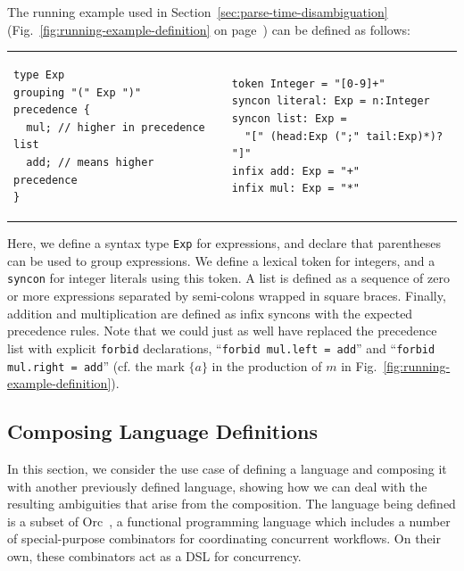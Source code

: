 \documentclass[acmsmall,review,anonymous]{acmart}\settopmatter{printfolios=true,printccs=false,printacmref=false}
\newcommand{\syncon}{\lstinline[language=syncon]}
\begin{document}
The running example used in
Section~\ref{sec:parse-time-disambiguation}
(Fig.~\ref{fig:running-example-definition} on
page~\pageref{fig:running-example-definition}) can be defined as
follows:

\begin{tabular}{ll}
\small
\begin{lstlisting}[language=syncon,boxpos=t]
type Exp
grouping "(" Exp ")"
precedence {
  mul; // higher in precedence list
  add; // means higher precedence
}
\end{lstlisting}
&
\small
\begin{lstlisting}[language=syncon,boxpos=t]
token Integer = "[0-9]+"
syncon literal: Exp = n:Integer
syncon list: Exp =
  "[" (head:Exp (";" tail:Exp)*)? "]"
infix add: Exp = "+"
infix mul: Exp = "*"
\end{lstlisting}
\end{tabular}\smallskip

\noindent Here, we define a syntax type \syncon{Exp} for
expressions, and declare that parentheses can be used to group
expressions. We define a lexical token for integers, and a
\syncon{syncon} for integer literals using this token. A list is
defined as a sequence of zero or more expressions separated by
semi-colons wrapped in square braces. Finally, addition and
multiplication are defined as infix syncons with the expected
precedence rules. Note that we could just as well have replaced
the precedence list with explicit \syncon{forbid} declarations,
``\syncon{forbid mul.left = add}'' and ``\syncon{forbid mul.right = add}''
(cf. the mark $\{a\}$ in the production of $m$ in
Fig.~\ref{fig:running-example-definition}).



\subsection{Composing Language Definitions} \label{sec:evaluation-orc}

In this section, we consider the use case of defining a language
and composing it with another previously defined language, showing
how we can deal with the resulting ambiguities that arise from the
composition.
%
The language being defined is a subset of
Orc~\cite{kitchinOrc2009}, a functional programming language which
includes a number of special-purpose combinators for coordinating
concurrent workflows. On their own, these combinators act as a DSL
for concurrency.
\end{document}
